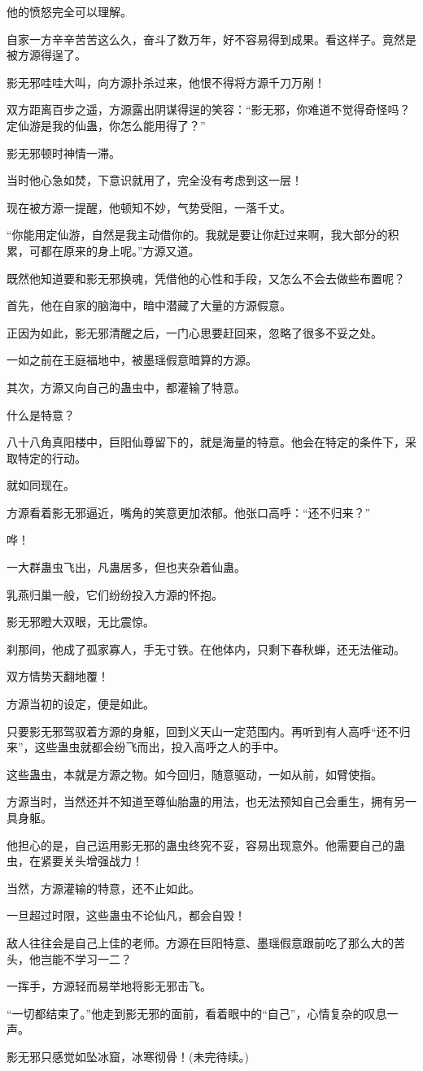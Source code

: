 \begin{this_body}
他的愤怒完全可以理解。

自家一方辛辛苦苦这么久，奋斗了数万年，好不容易得到成果。看这样子。竟然是被方源得逞了。

影无邪哇哇大叫，向方源扑杀过来，他恨不得将方源千刀万剐！

双方距离百步之遥，方源露出阴谋得逞的笑容：“影无邪，你难道不觉得奇怪吗？定仙游是我的仙蛊，你怎么能用得了？”

影无邪顿时神情一滞。

当时他心急如焚，下意识就用了，完全没有考虑到这一层！

现在被方源一提醒，他顿知不妙，气势受阻，一落千丈。

“你能用定仙游，自然是我主动借你的。我就是要让你赶过来啊，我大部分的积累，可都在原来的身上呢。”方源又道。

既然他知道要和影无邪换魂，凭借他的心性和手段，又怎么不会去做些布置呢？

首先，他在自家的脑海中，暗中潜藏了大量的方源假意。

正因为如此，影无邪清醒之后，一门心思要赶回来，忽略了很多不妥之处。

一如之前在王庭福地中，被墨瑶假意暗算的方源。

其次，方源又向自己的蛊虫中，都灌输了特意。

什么是特意？

八十八角真阳楼中，巨阳仙尊留下的，就是海量的特意。他会在特定的条件下，采取特定的行动。

就如同现在。

方源看着影无邪逼近，嘴角的笑意更加浓郁。他张口高呼：“还不归来？”

哗！

一大群蛊虫飞出，凡蛊居多，但也夹杂着仙蛊。

乳燕归巢一般，它们纷纷投入方源的怀抱。

影无邪瞪大双眼，无比震惊。

刹那间，他成了孤家寡人，手无寸铁。在他体内，只剩下春秋蝉，还无法催动。

双方情势天翻地覆！

方源当初的设定，便是如此。

只要影无邪驾驭着方源的身躯，回到义天山一定范围内。再听到有人高呼“还不归来”，这些蛊虫就都会纷飞而出，投入高呼之人的手中。

这些蛊虫，本就是方源之物。如今回归，随意驱动，一如从前，如臂使指。

方源当时，当然还并不知道至尊仙胎蛊的用法，也无法预知自己会重生，拥有另一具身躯。

他担心的是，自己运用影无邪的蛊虫终究不妥，容易出现意外。他需要自己的蛊虫，在紧要关头增强战力！

当然，方源灌输的特意，还不止如此。

一旦超过时限，这些蛊虫不论仙凡，都会自毁！

敌人往往会是自己上佳的老师。方源在巨阳特意、墨瑶假意跟前吃了那么大的苦头，他岂能不学习一二？

一挥手，方源轻而易举地将影无邪击飞。

“一切都结束了。”他走到影无邪的面前，看着眼中的“自己”，心情复杂的叹息一声。

影无邪只感觉如坠冰窟，冰寒彻骨！(未完待续。)

\end{this_body}

